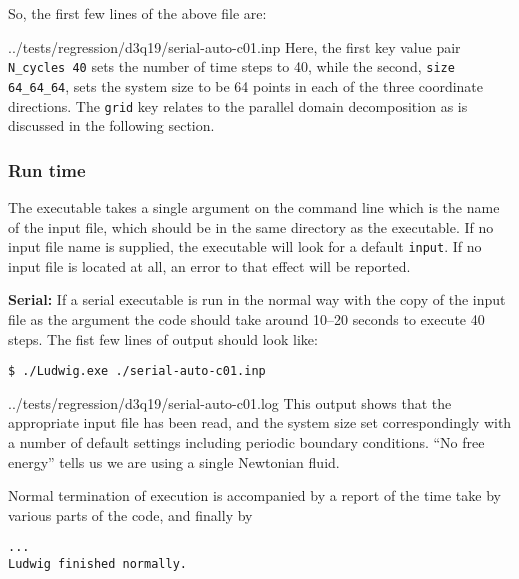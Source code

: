 So, the first few lines of the above file are:

{../tests/regression/d3q19/serial-auto-c01.inp}
Here, the first key value pair \texttt{N\_cycles 40} sets the number
of time steps to 40, while the second, \texttt{size 64\_64\_64}, sets
the system size to be 64 points in each of the three coordinate
directions. The \texttt{grid} key relates to the parallel
domain decomposition as is discussed in the following
section.

\subsubsection{Run time}

The executable takes a single argument on the command line which
is the name of the input file, which should be in the same
directory as the executable. If no input file name is supplied,
the executable will look for a default \texttt{input}. If no
input file is located at all, an error to that effect will be
reported.

\textbf{Serial: }
If a serial executable is run in the normal way with the copy of the
input file as the argument the code should take around 10--20 seconds
to execute 40 steps. The fist few lines of output should look like:

\begin{lstlisting}[belowskip=0pt]
$ ./Ludwig.exe ./serial-auto-c01.inp
\end{lstlisting}

{../tests/regression/d3q19/serial-auto-c01.log}
This output shows that the appropriate input file has been read, and
the system size set correspondingly with a number of default settings
including periodic boundary conditions. ``No free energy'' tells us we
are using a single Newtonian fluid.

Normal termination of execution is accompanied by a report
of the time take by various parts of the code, and finally by
\begin{lstlisting}
...
Ludwig finished normally.
\end{lstlisting}


